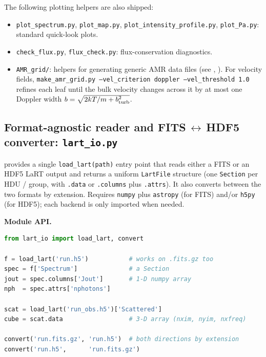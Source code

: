 \documentclass[english,a4paper]{my_memo}
\begin{document}
The following plotting helpers are also shipped:
\begin{itemize}
  \item \begin{sloppypar}\texttt{plot\_spectrum.py}, \texttt{plot\_map.py},
        \texttt{plot\_intensity\_profile.py},
        \texttt{plot\_Pa.py}: standard quick-look plots.\end{sloppypar}
  \item \texttt{check\_flux.py}, \texttt{flux\_check.py}: flux-conservation
        diagnostics.
  \item \begin{sloppypar}\texttt{AMR\_grid/}: helpers for generating generic AMR data files
        (see ,
        ).  For velocity fields,
        \texttt{make\_amr\_grid.py --vel\_criterion doppler --vel\_threshold 1.0}
        refines each leaf until the bulk velocity changes across it by at most
        one Doppler width $b=\sqrt{2kT/m+b_{\rm turb}^2}$.\end{sloppypar}
\end{itemize}

\subsection{Format-agnostic reader and FITS\,$\leftrightarrow$\,HDF5 converter: \texttt{lart\_io.py}}
\label{sec:lart_io}

 provides a single \texttt{load\_lart(path)}
entry point that reads either a FITS or an HDF5 LaRT output and returns
a uniform \texttt{LartFile} structure (one \texttt{Section} per HDU /
group, with \texttt{.data} or \texttt{.columns} plus \texttt{.attrs}).
It also converts between the two formats by extension.  Requires
\texttt{numpy} plus \texttt{astropy} (for FITS) and/or \texttt{h5py}
(for HDF5); each backend is only imported when needed.

\smallskip\noindent\textbf{Module API.}

\begin{lstlisting}[language=Python]
from lart_io import load_lart, convert

f = load_lart('run.h5')           # works on .fits.gz too
spec = f['Spectrum']              # a Section
jout = spec.columns['Jout']       # 1-D numpy array
nph  = spec.attrs['nphotons']

scat = load_lart('run_obs.h5')['Scattered']
cube = scat.data                  # 3-D array (nxim, nyim, nxfreq)

convert('run.fits.gz', 'run.h5')  # both directions by extension
convert('run.h5',      'run.fits.gz')
\end{lstlisting}
\end{document}
